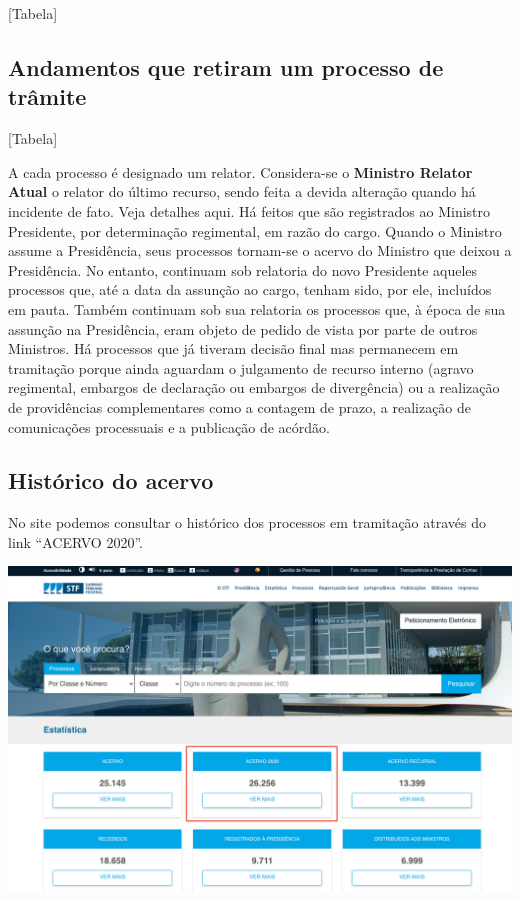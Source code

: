 \documentclass[
]{book}
\theoremstyle{definition}
\theoremstyle{definition}
\theoremstyle{definition}
\theoremstyle{definition}
\theoremstyle{remark}
\begin{document}
{[}Tabela{]}

\hypertarget{andamentos-que-retiram-um-processo-de-truxe2mite}{%
\subsection{Andamentos que retiram um processo de trâmite}\label{andamentos-que-retiram-um-processo-de-truxe2mite}}

{[}Tabela{]}

A cada processo é designado um relator. Considera-se o \textbf{Ministro Relator Atual} o relator do último recurso, sendo feita a devida alteração quando há incidente de fato. Veja detalhes aqui.
Há feitos que são registrados ao Ministro Presidente, por determinação regimental, em razão do cargo. Quando o Ministro assume a Presidência, seus processos tornam-se o acervo do Ministro que deixou a Presidência. No entanto, continuam sob relatoria do novo Presidente aqueles processos que, até a data da assunção ao cargo, tenham sido, por ele, incluídos em pauta. Também continuam sob sua relatoria os processos que, à época de sua assunção na Presidência, eram objeto de pedido de vista por parte de outros Ministros.
Há processos que já tiveram decisão final mas permanecem em tramitação porque ainda aguardam o julgamento de recurso interno (agravo regimental, embargos de declaração ou embargos de divergência) ou a realização de providências complementares como a contagem de prazo, a realização de comunicações processuais e a publicação de acórdão.

\hypertarget{histuxf3rico-do-acervo}{%
\subsection{Histórico do acervo}\label{histuxf3rico-do-acervo}}

No site podemos consultar o histórico dos processos em tramitação através do link ``ACERVO 2020''.

\includegraphics[width=1\linewidth]{imagens/fig-cap4-1}
\end{document}
